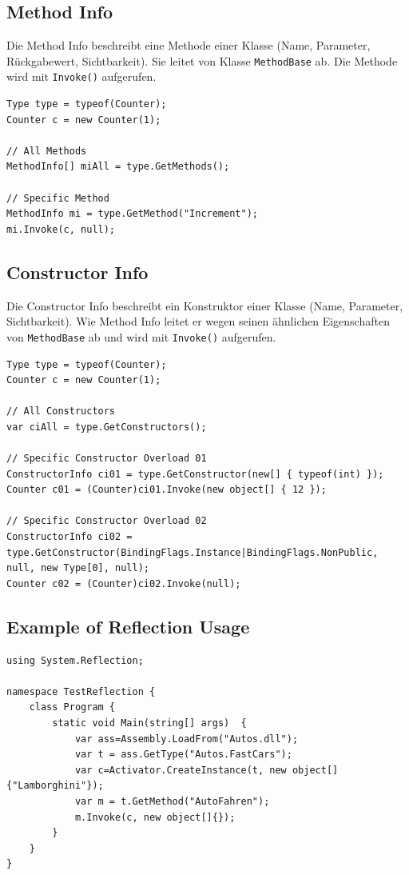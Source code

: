 \documentclass[
a4paper,
oneside,
10pt,
fleqn,
headsepline,
toc=listofnumbered, 
bibliography=totocnumbered]{scrartcl}
\begin{document}
\clearpage

\subsection{Method Info}
Die Method Info beschreibt eine Methode einer Klasse (Name, Parameter, Rückgabewert, Sichtbarkeit). Sie leitet von Klasse \lstinline|MethodBase| ab. Die Methode wird mit \lstinline|Invoke()| aufgerufen.
\begin{lstlisting}[caption=Reflection: Method Info]
Type type = typeof(Counter);
Counter c = new Counter(1);

// All Methods
MethodInfo[] miAll = type.GetMethods();

// Specific Method
MethodInfo mi = type.GetMethod("Increment");
mi.Invoke(c, null);
\end{lstlisting}

\subsection{Constructor Info}
Die Constructor Info beschreibt ein Konstruktor einer Klasse (Name, Parameter, Sichtbarkeit). Wie Method Info leitet er wegen seinen ähnlichen Eigenschaften von \lstinline|MethodBase| ab und wird  mit \lstinline|Invoke()| aufgerufen.
\begin{lstlisting}[caption=Reflection: Constructor Info]
Type type = typeof(Counter);
Counter c = new Counter(1);

// All Constructors
var ciAll = type.GetConstructors();

// Specific Constructor Overload 01
ConstructorInfo ci01 = type.GetConstructor(new[] { typeof(int) });
Counter c01 = (Counter)ci01.Invoke(new object[] { 12 });

// Specific Constructor Overload 02
ConstructorInfo ci02 = type.GetConstructor(BindingFlags.Instance|BindingFlags.NonPublic, null, new Type[0], null);
Counter c02 = (Counter)ci02.Invoke(null);
\end{lstlisting}

\subsection{Example of Reflection Usage}
\begin{lstlisting}
using System.Reflection;

namespace TestReflection {
    class Program {
        static void Main(string[] args)  {
            var ass=Assembly.LoadFrom("Autos.dll");
            var t = ass.GetType("Autos.FastCars");
            var c=Activator.CreateInstance(t, new object[] {"Lamborghini"});
            var m = t.GetMethod("AutoFahren");
            m.Invoke(c, new object[]{});
        }
    }
} 
\end{lstlisting}
\end{document}
